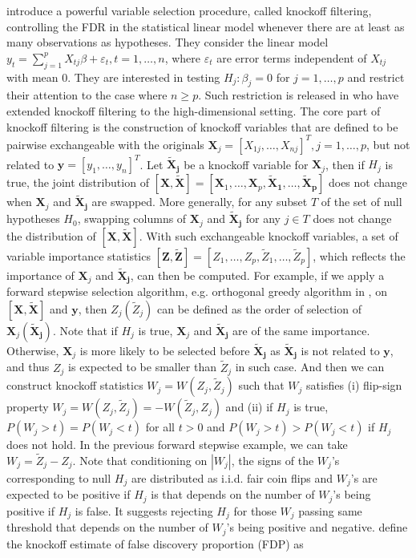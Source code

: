 \documentclass[a4paper,12pt]{article}
\begin{document}
\cite{barber2015controlling} introduce a powerful variable selection procedure, called knockoff filtering, controlling the FDR in the statistical linear model whenever there are at least as many observations as hypotheses. They consider the linear model $y_t = \sum_{j=1}^p X_{tj} \beta + \varepsilon_t, t=1,\ldots,n$, where $\varepsilon_t$ are error terms independent of $X_{tj}$ with mean $0$. They are interested in testing $H_j: \beta_j=0$ for $j=1,\ldots, p$ and restrict their attention to the case where $n \ge p$. Such restriction is released in \cite{barber2019knockoff} who have extended knockoff filtering to the high-dimensional setting. The core part of knockoff filtering is the construction of knockoff variables that are defined to be pairwise exchangeable with the originals $\bm X_j = [X_{1j}, \ldots, X_{nj}]^T, j = 1, \ldots, p$, but not related to $\bm y = [y_1, \ldots, y_n]^T$. Let $\bm{\tilde X_j}$ be a knockoff variable for $\bm X_j$, then if $H_j$ is true, the joint distribution of $[\bm X, \bm{\tilde X}] = [\bm X_1, \ldots, \bm X_p, \bm{\tilde X_1}, \ldots, \bm{\tilde X_p}]$ does not change when $\bm X_j$ and $\bm{\tilde X_j}$ are swapped. More generally, for any subset $T$ of the set of null hypotheses $H_0$, swapping columns of $\bm X_j$ and $\bm{\tilde X_j}$ for any $j \in T$ does not change the distribution of $[\bm X, \bm{\tilde X}]$. With such exchangeable knockoff variables, a set of variable importance statistics $[\bm Z, \bm{\tilde Z}] = [Z_1, \ldots, Z_p, \tilde Z_1, \ldots, \tilde Z_p]$, which reflects the importance of $\bm X_j$ and $\bm{\tilde X_j}$, can then be computed. For example, if we apply a forward stepwise selection algorithm, e.g. orthogonal greedy algorithm in \cite{ing2017multiple}, on $[\bm X, \bm{\tilde X}]$ and $\bm y$, then $Z_j (\tilde Z_j)$ can be defined as the order of selection of $\bm X_j (\bm{\tilde X_j})$. Note that if $H_j$ is true, $\bm X_j$ and $\bm{\tilde X_j}$ are of the same importance. Otherwise, $\bm X_j$ is more likely to be selected before $\bm{\tilde X_j}$ as $\bm{\tilde X_j}$ is not related to $\bm y$, and thus $Z_j$ is expected to be smaller than $\tilde Z_j$ in such case. And then we can construct knockoff statistics $W_j = W(Z_j, \tilde Z_j)$ such that $W_j$ satisfies (i) flip-sign property $W_j = W(Z_j, \tilde Z_j) = -W(\tilde Z_j, Z_j)$ and (ii) if $H_j$ is true, $P(W_j > t) = P(W_j < t)$ for all $t>0$ and $P(W_j > t) > P(W_j < t)$ if $H_j$ does not hold. In the previous forward stepwise example, we can take $W_j = \tilde Z_j - Z_j$. Note that conditioning on $|W_j|$, the signs of the $W_j$'s corresponding to null $H_j$ are distributed as i.i.d. fair coin flips and $W_j$'s are expected to be positive if $H_j$ is that depends on the number of $W_j$'s being positive if $H_j$ is false. It suggests rejecting $H_j$ for those $W_j$ passing same threshold that depends on the number of $W_j$'s being positive and negative. \cite{barber2015controlling} define the knockoff estimate of false discovery proportion (FDP) as
\end{document}
